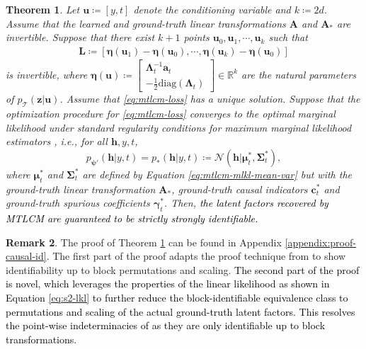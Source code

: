 \documentclass[10pt]{article} %
\theoremstyle{plain}
\newtheorem{theorem}{Theorem}[section]
\theoremstyle{definition}
\newtheorem{remark}[theorem]{Remark}
\begin{document}
\begin{theorem}\label{thm:strong-id}
    Let $\mathbf{u}\coloneqq[y,t]$ denote the conditioning variable and $k\coloneqq2d$. Assume that the learned and ground-truth linear transformations $\mathbf{A}$ and $\mathbf{A}_{*}$ are invertible. Suppose that there exist $k+1$ points $\mathbf{u}_0, \mathbf{u}_1,\cdots,\mathbf{u}_{k}$ such that
    \begin{align}
        \mathbf{L}\coloneqq[\boldsymbol{\eta}(\mathbf{u}_1)-\boldsymbol{\eta}(\mathbf{u}_0),\cdots,\boldsymbol{\eta}(\mathbf{u}_{k})-\boldsymbol{\eta}(\mathbf{u}_0)]
    \end{align}
    is invertible, where $\boldsymbol{\eta}(\mathbf{u})\coloneqq\left[\begin{smallmatrix}\boldsymbol{\Lambda}_t^{-1}\mathbf{a}_t \\ -\frac{1}{2}\text{diag}(\boldsymbol{\Lambda}_t)\end{smallmatrix}\right]\in\mathbb{R}^{k}$ are the natural parameters of $p_{\mathcal{T}}(\mathbf{z}|\mathbf{u})$. Assume that \eqref{eq:mtlcm-loss} has a unique solution. Suppose that the optimization procedure for \eqref{eq:mtlcm-loss} converges to the optimal marginal likelihood under standard regularity conditions for maximum marginal likelihood estimators \textcolor{black}{\citep{gurland1954regularity}}, i.e., for all $\mathbf{h},y,t$,
    \begin{equation}
        p_{\boldsymbol{\psi}'}(\mathbf{h}|y,t)=p_{*}(\mathbf{h}|y,t)\coloneqq\mathcal{N}(\mathbf{h}|\boldsymbol{\mu}_t^*,\boldsymbol{\Sigma}_t^*),
    \end{equation}
    where $\boldsymbol{\mu}_t^*$ and $\boldsymbol{\Sigma}_t^*$ are defined by Equation \eqref{eq:mtlcm-mlkl-mean-var} but with the ground-truth linear transformation $\mathbf{A}_*$, ground-truth causal indicators $\mathbf{c}_t^*$ and ground-truth spurious coefficients $\boldsymbol{\gamma}_t^*$. Then, \textcolor{black}{the latent factors recovered by MTLCM are guaranteed to be strictly strongly identifiable.} 
\end{theorem}
\begin{remark}
    The proof of Theorem \ref{thm:strong-id} can be found in Appendix \ref{appendix:proof-causal-id}. The first part of the proof adapts the proof technique from \citet{Khemakhem_Kingma_Monti_Hyvarinen_2020} to show identifiability up to block permutations and scaling. \textcolor{black}{The second part of the proof is novel, which leverages the properties of the linear likelihood as shown in Equation \eqref{eq:s2-lkl} to further reduce the block-identifiable equivalence class to permutations and scaling of the actual ground-truth latent factors. This resolves the point-wise indeterminacies of \citet{Khemakhem_Kingma_Monti_Hyvarinen_2020,Lu_Wu_Hernandez-Lobato_Scholkopf_2022} as they are only identifiable up to block transformations.}
\end{remark}
\end{document}
